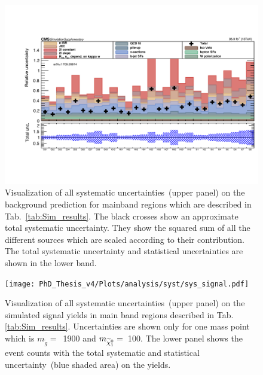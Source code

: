 \begin{figure}[!hbt]
    \begin{center}
  \includegraphics[width=0.9 \textwidth]{Plots/analysis/syst/plots_zerob_kappa_systematics_zerob}
  \caption[Summary of systematic uncertainty for background prediction]{ \label{fig:systBKG} Visualization of all systematic uncertainties~(upper panel) on the background prediction for mainband regions which are described in Tab.~\ref{tab:Sim_results}. The black crosses show an approximate total systematic uncertainty. They show the squared sum of all the different sources which are scaled according to their contribution. The total systematic uncertainty and statistical uncertainties are shown in the lower band.}
  \end{center}
\end{figure}
\begin{figure}[!hbt]
    \begin{center}
  \texttt{[image: PhD\_Thesis\_v4/Plots/analysis/syst/sys\_signal.pdf]}
\caption[Summary of systematic uncertainty for signal simulation.]{ \label{fig:systSig1} Visualization of all systematic uncertainties~(upper panel) on the simulated signal yields in main band regions described in Tab. \ref{tab:Sim_results}. Uncertainties are shown only for one mass point which is  $m_{\tilde{g}}=$~1900 and $m_{\widetilde{\chi}^0_1}=$~100. The lower panel shows the event counts with the total systematic and statistical uncertainty~(blue shaded area) on the yields.}
  \end{center}
\end{figure}
